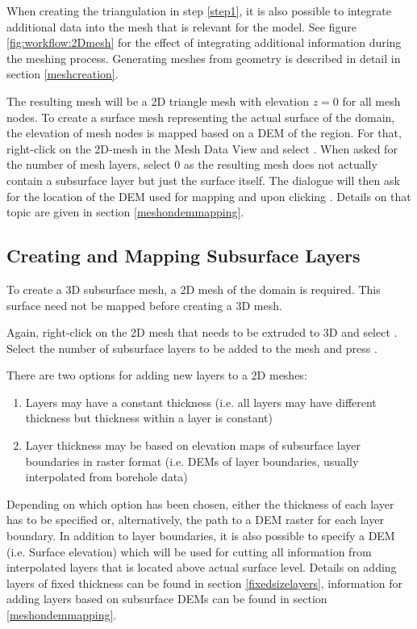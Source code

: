 When creating the triangulation in step \ref{step1}, it is also possible to integrate additional data into the mesh that is relevant for the model. See figure \ref{fig:workflow:2Dmesh} for the effect of integrating additional information during the meshing process. Generating meshes from geometry is described in detail in section \ref{meshcreation}.

The resulting mesh will be a 2D triangle mesh with elevation $z=0$ for all mesh nodes. To create a surface mesh representing the actual surface of the domain, the elevation of mesh nodes is mapped based on a DEM of the region. For that, right-click on the 2D-mesh in the Mesh Data View and select . When asked for the number of mesh layers, select $0$ as the resulting mesh does not actually contain a subsurface layer but just the surface itself. The dialogue will then ask for the location of the DEM used for mapping and upon clicking
. Details on that topic are given in section \ref{meshondemmapping}.


\subsection{Creating and Mapping Subsurface Layers}

To create a 3D subsurface mesh, a 2D mesh of the domain is required. This surface need not be mapped before creating a 3D mesh.

Again, right-click on the 2D mesh that needs to be extruded to 3D and select . Select the number of subsurface layers to be added to the mesh and press .

There are two options for adding new layers to a 2D meshes:
\begin{enumerate}
\item Layers may have a constant thickness (i.e. all layers may have different thickness but thickness within a layer is constant)
\item Layer thickness may be based on elevation maps of subsurface layer boundaries in raster format (i.e. DEMs of layer boundaries, usually interpolated from borehole data)
\end{enumerate}

Depending on which option has been chosen, either the thickness of each layer has to be specified or, alternatively, the path to a DEM raster for each layer boundary. In addition to layer boundaries, it is also possible to specify a DEM (i.e. Surface elevation) which will be used for cutting all information from interpolated layers that is located above actual surface level. Details on adding layers of fixed thickness can be found in section \ref{fixedsizelayers}, information for adding layers based on subsurface DEMs can be found in section \ref{meshondemmapping}.

